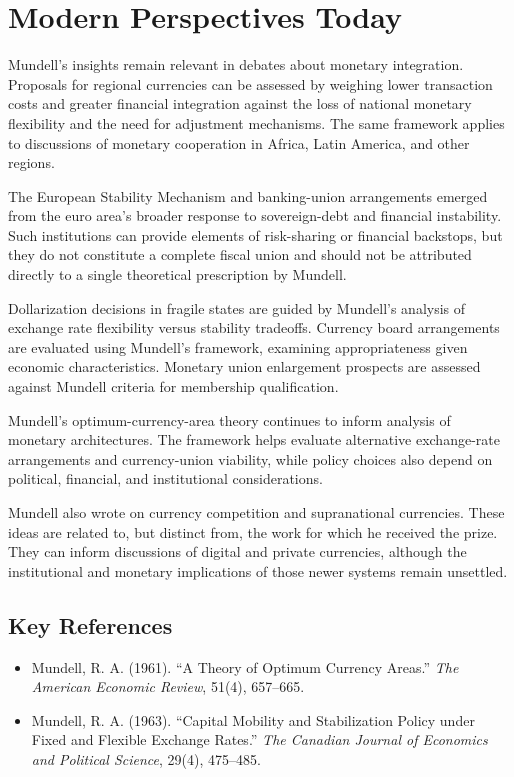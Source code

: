 \section{Modern Perspectives Today}
Mundell's insights remain relevant in debates about monetary integration. Proposals
for regional currencies can be assessed by weighing lower transaction costs and
greater financial integration against the loss of national monetary flexibility
and the need for adjustment mechanisms. The same framework applies to discussions
of monetary cooperation in Africa, Latin America, and other regions.

The European Stability Mechanism and banking-union arrangements emerged from the
euro area's broader response to sovereign-debt and financial instability. Such
institutions can provide elements of risk-sharing or financial backstops, but they
do not constitute a complete fiscal union and should not be attributed directly
to a single theoretical prescription by Mundell.

Dollarization decisions in fragile states are guided by Mundell's analysis of
exchange rate flexibility versus stability tradeoffs. Currency board arrangements
are evaluated using Mundell's framework, examining appropriateness given economic
characteristics. Monetary union enlargement prospects are assessed against
Mundell criteria for membership qualification.

Mundell's optimum-currency-area theory continues to inform analysis of monetary
architectures. The framework helps evaluate alternative exchange-rate arrangements
and currency-union viability, while policy choices also depend on political,
financial, and institutional considerations.

Mundell also wrote on currency competition and supranational currencies. These
ideas are related to, but distinct from, the work for which he received the prize.
They can inform discussions of digital and private currencies, although the
institutional and monetary implications of those newer systems remain unsettled.

\subsection*{Key References}
\begin{itemize}
    \item Mundell, R. A. (1961). ``A Theory of Optimum Currency Areas.'' \textit{The American Economic Review}, 51(4), 657--665.
    \item Mundell, R. A. (1963). ``Capital Mobility and Stabilization Policy under Fixed and Flexible Exchange Rates.'' \textit{The Canadian Journal of Economics and Political Science}, 29(4), 475--485.
\end{itemize}
